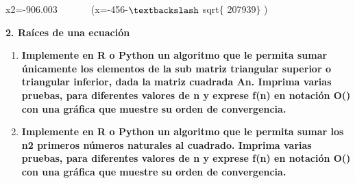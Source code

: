 \documentclass[12pt]{article}
\renewcommand{\_}{\kern-1.5pt\textunderscore\kern-1.5pt}
\begin{document}
\begin{adjustwidth}{1.0in}{0.0in}
\begin{justify}
{\fontsize{10pt}{12.0pt}\selectfont x2=-906.003\ \ \ \ \ \ \  (x=-456-$\textbackslash$ sqrt$ \{ $ 207939$ \} $ )\par}
\end{justify}\par

\end{adjustwidth}


\vspace{\baselineskip}
\setlength{\parskip}{8.04pt}

\vspace{\baselineskip}
\setlength{\parskip}{0.0pt}
\setlength{\parskip}{8.04pt}

\vspace{\baselineskip}
\setlength{\parskip}{0.0pt}
\setlength{\parskip}{8.04pt}
\setlength{\parskip}{0.0pt}
\begin{justify}
\textbf{2. Raíces de una ecuación}{\fontsize{10pt}{12.0pt}\selectfont \textbf{ }\par}
\end{justify}\par

\begin{enumerate}
	\item {\fontsize{10pt}{12.0pt}\selectfont \textbf{Implemente en R o Python un algoritmo que le permita sumar únicamente los elementos de la sub matriz triangular superior o triangular inferior, dada la matriz cuadrada An. Imprima varias pruebas, para diferentes valores de n y exprese f(n) en notación O() con una gráﬁca que muestre su orden de convergencia.}\par}\par


\vspace{\baselineskip}
	\item {\fontsize{10pt}{12.0pt}\selectfont \textbf{Implemente en R o Python un algoritmo que le permita sumar los n2 primeros números naturales al cuadrado. Imprima varias pruebas, para diferentes valores de n y exprese f(n) en notación O() con una gráﬁca que muestre su orden de convergencia.}\par}
\end{enumerate}\par


\vspace{\baselineskip}
\setlength{\parskip}{8.04pt}


\end{document}
